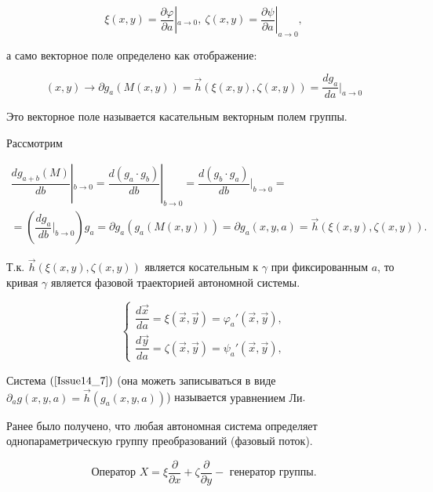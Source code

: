 \[ \xi(x,y) = \dfrac{\partial \varphi}{\partial a}|_{a \rightarrow 0},\ \zeta(x,y) = \dfrac{\partial \psi }{\partial a}|_{a \rightarrow 0}, \]

а само векторное поле определено как отображение:

\begin{equation}
	(x,y) \rightarrow \partial g_a(M(x,y)) = \vec{h}(\xi(x,y), \zeta(x,y)) = \dfrac{dg_a}{da}|_{a \rightarrow 0}
	\label{Issue14_6}
\end{equation}

Это векторное поле называется $\textbf{касательным векторным полем}$ группы.

Рассмотрим 

\begin{equation}
	\begin{gathered}
		\dfrac{dg_{a+b}(M)}{db}|_{b\rightarrow 0} = \dfrac{d(g_a\cdot g_b)}{db}|_{b\rightarrow0} = \dfrac{d(g_b\cdot g_a)}{db}|_{b\rightarrow 0} = \\
		= (\dfrac{dg_a}{db}|_{b\rightarrow 0})g_a = \partial g_a (g_a(M(x,y))) = \partial g_a (x,y,a) = \vec{h}(\xi(x,y), \zeta(x,y)).
	\end{gathered}
\end{equation}

Т.к. $\vec{h}(\xi(x,y), \zeta(x,y))$ является косательным к $\gamma$ при фиксированным $a$, то кривая $\gamma$ является $\textbf{фазовой траекторией}$ автономной системы.

\begin{equation}
	\begin{cases}
		\dfrac{d\vec{x}}{da} = \xi(\vec{x}, \vec{y}) = \varphi_a'(\vec{x}, \vec{y}), \\
		\dfrac{d\vec{y}}{da} = \zeta(\vec{x}, \vec{y}) = \psi_a'(\vec{x}, \vec{y}),		
	\end{cases}
	\label{Issue14_7}
\end{equation}

Система $(\ref{Issue14_7})$ (она можеть записываться в виде $\partial_a g(x,y,a) = \vec{h}(g_a(x,y,a))$) называется $\textbf{уравнением Ли}$.

Ранее было получено, что любая автономная система определяет однопараметрическую группу преобразований (фазовый поток).


\begin{equation}
\text{Оператор } X = \xi \dfrac{\partial}{\partial x} + \zeta \dfrac{\partial}{\partial y} - \text{ генератор группы.}
\label{Issue14_8}
\end{equation}

